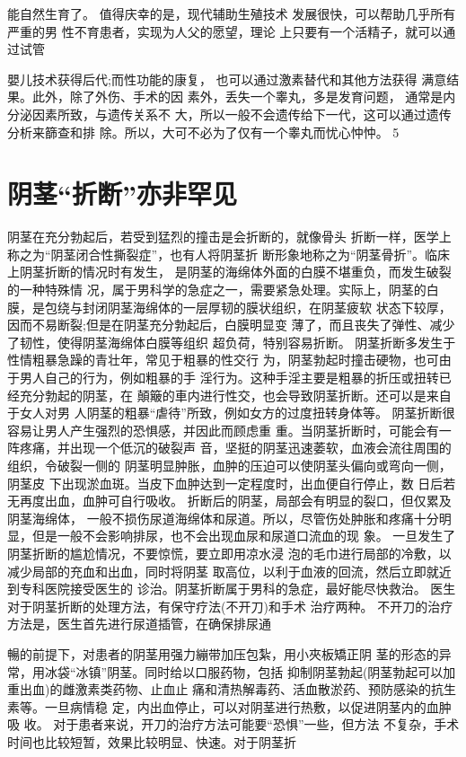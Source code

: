 \documentclass[12pt,UTF8]{ctexbook}
\begin{document}
能自然生育了。
值得庆幸的是，现代辅助生殖技术
发展很快，可以帮助几乎所有严重的男
性不育患者，实现为人父的愿望，理论
上只要有一个活精子，就可以通过试管

嬰儿技术获得后代;而性功能的康复，
也可以通过激素替代和其他方法获得
满意结果。此外，除了外伤、手术的因
素外，丢失一个睾丸，多是发育问题，
通常是内分泌因素所致，与遗传关系不
大，所以一般不会遗传给下一代，这可以通过遗传分析来篩查和排
除。所以，大可不必为了仅有一个睾丸而忧心忡忡。
5
\section{阴茎“折断”亦非罕见}
阴茎在充分勃起后，若受到猛烈的撞击是会折断的，就像骨头
折断一样，医学上称之为“阴茎闭合性撕裂症”，也有人将阴茎折
断形象地称之为“阴茎骨折”。临床上阴茎折断的情况时有发生，
是阴茎的海绵体外面的白膜不堪重负，而发生破裂的一种特殊情
况，属于男科学的急症之一，需要紧急处理。实际上，阴茎的白
膜，是包绕与封闭阴茎海绵体的一层厚韧的膜状组织，在阴茎疲软
状态下较厚，因而不易断裂;但是在阴茎充分勃起后，白膜明显变
薄了，而且丧失了弹性、减少了韧性，使得阴茎海绵体白膜等组织
超负荷，特别容易折断。
阴茎折断多发生于性情粗暴急躁的青壮年，常见于粗暴的性交行
为，阴茎勃起时撞击硬物，也可由于男人自己的行为，例如粗暴的手
淫行为。这种手淫主要是粗暴的折压或扭转已经充分勃起的阴茎，在
顛簸的車内进行性交，也会导致阴茎折断。还可以是来自于女人对男
人阴茎的粗暴“虐待”所致，例如女方的过度扭转身体等。
阴茎折断很容易让男人产生强烈的恐惧感，并因此而顾虑重
重。当阴茎折断时，可能会有一阵疼痛，并出现一个低沉的破裂声
音，坚挺的阴茎迅速萎软，血液会流往周围的组织，令破裂一侧的
阴茎明显肿胀，血肿的压迫可以使阴茎头偏向或弯向一侧，阴茎皮
下出现淤血斑。当皮下血肿达到一定程度时，出血便自行停止，数
日后若无再度出血，血肿可自行吸收。
折断后的阴茎，局部会有明显的裂口，但仅累及阴茎海绵体，
一般不损伤尿道海绵体和尿道。所以，尽管伤处肿胀和疼痛十分明
显，但是一般不会影响排尿，也不会出现血尿和尿道口流血的现
象。
一旦发生了阴茎折断的尴尬情况，不要惊慌，要立即用凉水浸
泡的毛巾进行局部的冷敷，以减少局部的充血和出血，同时将阴茎
取高位，以利于血液的回流，然后立即就近到专科医院接受医生的
诊治。阴茎折断属于男科的急症，最好能尽快救治。
医生对于阴茎折断的处理方法，有保守疗法(不开刀)和手术
治疗两种。
不开刀的治疗方法是，医生首先进行尿道插管，在确保排尿通

暢的前提下，对患者的阴茎用强力繃带加压包紮，用小夾板矯正阴
茎的形态的异常，用冰袋“冰镇”阴茎。同时给以口服药物，包括
抑制阴茎勃起(阴茎勃起可以加重出血)的雌激素类药物、止血止
痛和清热解毒药、活血散淤药、预防感染的抗生素等。一旦病情稳
定，内出血停止，可以对阴茎进行热敷，以促进阴茎内的血肿吸
收。
对于患者来说，开刀的治疗方法可能要“恐惧”一些，但方法
不复杂，手术时间也比较短暂，效果比较明显、快速。对于阴茎折
\end{document}
